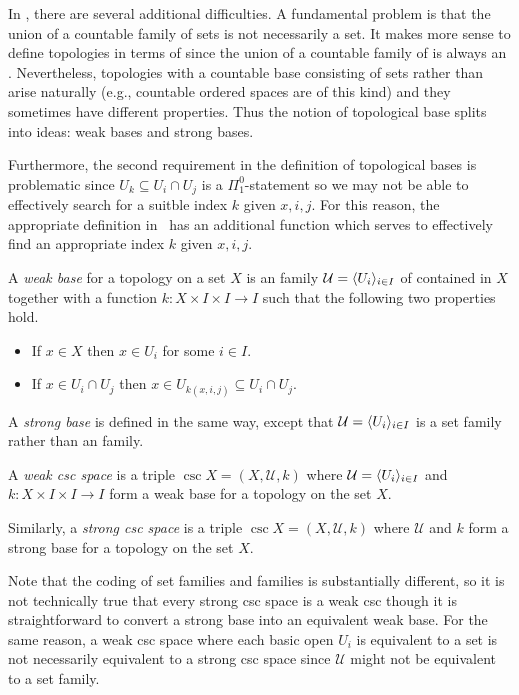 \documentclass[csc]{subfiles}
\begin{document}
In \RCA, there are several additional difficulties.
A fundamental problem is that the union of a countable family of sets is not necessarily a set.
It makes more sense to define topologies in terms of  since the union of a countable family of  is always an \eset{}.
Nevertheless, topologies with a countable base consisting of sets rather than  arise naturally (e.g., countable ordered spaces are of this kind) and they sometimes have different properties.
Thus the notion of topological base splits into ideas: weak bases and strong bases.

Furthermore, the second requirement in the definition of topological bases is problematic since \(U_k \subseteq U_i \cap U_j\) is a \(\Pi^0_1\)-statement so we may not be able to effectively search for a suitble index \(k\) given \(x,i,j.\)
For this reason, the appropriate definition in \RCA\ has an additional function which serves to effectively find an appropriate index \(k\) given \(x,i,j.\)

\begin{definition}[\RCA]\label{D:Base}
  A \emph{weak base} for a topology on a set \(X\) is an \eset{} family \(\mathcal{U} = \langle U_i\rangle_{i \in I}\) of  contained in \(X\) together with a function \(k: X \times I \times I \to I\) such that the following two properties hold.
  \begin{itemize}
  \item If \(x \in X\) then \(x \in U_i\) for some \(i \in I.\)
  \item If \(x \in U_i \cap U_j\) then \(x \in U_{k(x,i,j)} \subseteq U_i \cap U_j.\)
  \end{itemize}
  A \emph{strong base} is defined in the same way, except that \(\mathcal{U} = \langle U_i\rangle_{i \in I}\) is a set family rather than an \eset{} family.
\end{definition}


\begin{definition}[\RCA]\label{D:CSC}
  A \emph{weak csc space} is a triple \(\csc{X}=(X,\mathcal{U},k)\) where \(\mathcal{U} = \langle U_i\rangle_{i \in I}\) and \(k: X \times I \times I \to I\) form a weak base for a topology on the set \(X.\)

  Similarly, a \emph{strong csc space} is a triple \(\csc{X}=(X,\mathcal{U},k)\) where \(\mathcal{U}\) and \(k\) form a strong base for a topology on the set \(X.\)
\end{definition}

\noindent
Note that the coding of set families and \eset{} families is substantially different, so it is not technically true that every strong csc space is a weak csc though it is straightforward to convert a strong base into an equivalent weak base.
For the same reason, a weak csc space where each basic open \(U_i\) is equivalent to a set is not necessarily equivalent to a strong csc space since \(\mathcal{U}\) might not be equivalent to a set family.
\end{document}
